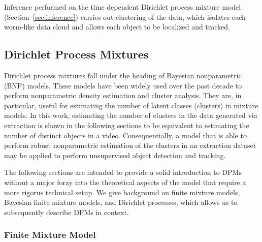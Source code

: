 \documentclass[smallcondensed, final]{svjour3}
\begin{document}
Inference performed on the time dependent Dirichlet process mixture model (Section~\ref{sec:inference}) carries out clustering of the data, which isolates each worm-like data cloud and allows each object to be localized and tracked.






\subsection{Dirichlet Process Mixtures}

Dirichlet process mixtures fall under the heading of Bayesian nonparametric (BNP) models. These models have been widely used over the past decade to perform nonparametric density estimation and cluster analysis. They are, in particular, useful for estimating the number of latent classes (clusters) in mixture models. In this work, estimating the number of clusters in the data generated via extraction is shown in the following sections to be equivalent to estimating the number of distinct objects in a video. Consequentially, a model that is able to perform robust nonparametric estimation of the clusters in an extraction dataset may be applied to perform unsupervised object detection and tracking.

The following sections are intended to provide a solid introduction to DPMs without a major foray into the theoretical aspects of the model that require a more rigorus technical setup. We give background on finite mixture models, Bayesian finite mixture models, and Dirichlet processes, which allows us to subsequently describe DPMs in context. 


\subsubsection{Finite Mixture Model}
\end{document}
